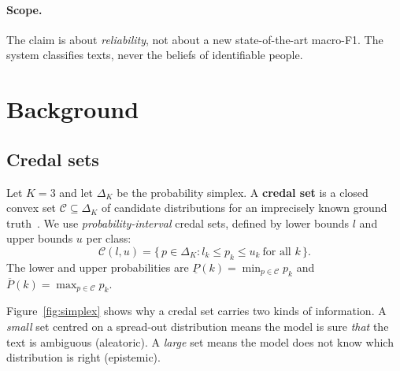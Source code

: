 \documentclass[11pt,a4paper]{article}
\newcommand{\lo}[1]{\underline{#1}}
\newcommand{\up}[1]{\overline{#1}}
\newcommand{\credal}{\mathcal{C}}
\newcommand{\simplex}{\Delta_K}
\begin{document}
\paragraph{Scope.} The claim is about \emph{reliability}, not about a new state-of-the-art
macro-F1. The system classifies texts, never the beliefs of identifiable people.

\section{Background}

\subsection{Credal sets}

Let $K = 3$ and let $\simplex$ be the probability simplex. A \textbf{credal set} is a closed
convex set $\credal \subseteq \simplex$ of candidate distributions for an imprecisely known
ground truth~\cite{walley1991}. We use \emph{probability-interval} credal sets, defined by
lower bounds $l$ and upper bounds $u$ per class:
\begin{equation}
  \credal(l,u) = \{\, p \in \simplex : l_k \le p_k \le u_k \ \text{for all } k \,\}.
  \label{eq:credal}
\end{equation}
The lower and upper probabilities are $\lo{P}(k) = \min_{p \in \credal} p_k$ and
$\up{P}(k) = \max_{p \in \credal} p_k$.

Figure~\ref{fig:simplex} shows why a credal set carries two kinds of information. A
\emph{small} set centred on a spread-out distribution means the model is sure \emph{that} the
text is ambiguous (aleatoric). A \emph{large} set means the model does not know which
distribution is right (epistemic).
\end{document}
